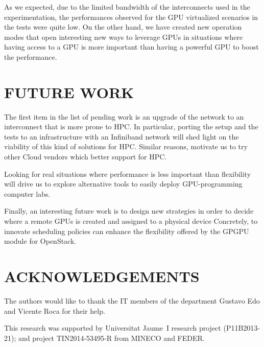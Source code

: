 \documentclass[a4paper,twoside]{article}
\begin{document}
As we expected, due to the limited bandwidth of the interconnects used in the experimentation, the performances observed for the GPU virtualized scenarios in the tests were quite low.
On the other hand, we have created new operation modes that open interesting new ways to leverage GPUs in situations where having access to a GPU is more important than having a powerful GPU to boost the performance.

\section{\uppercase{Future work}}
\label{sec:future}
The first item in the list of pending work is an upgrade of the network to an interconnect that is more prone to HPC.
In particular, porting the setup and the tests to an infrastructure with an Infiniband network will shed light on the viability of this kind of solutions for HPC.
Similar reasons, motivate us to try other Cloud vendors which better support for HPC.

Looking for real situations where performance is less important than flexibility will drive us to explore alternative tools to easily deploy GPU-programming computer labs.

Finally, an interesting future work is to design new strategies in order to decide where a remote GPUs is created and assigned to a physical device
Concretely, to innovate scheduling policies can enhance the flexibility offered by the GPGPU module for OpenStack.

\section*{\uppercase{Acknowledgements}}
The authors would like to thank the IT members of the department Gustavo Edo and Vicente Roca for their help.

This research was supported by Universitat Jaume~I research project (P11B2013-21); and project
TIN2014-53495-R from MINECO and FEDER.


{\small
}
\end{document}
